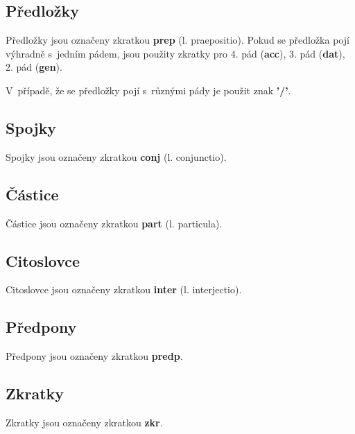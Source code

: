 \blspace
  \dicEntry {} 
  \dicEntry {}  
  \dicEntry {}  
\blspace

\subsection*{Předložky}

Předložky jsou označeny zkratkou \textbf{prep} (l. praepositio). Pokud se předložka pojí výhradně s~jedním pádem, jsou použity zkratky pro 4. pád (\textbf{acc}), 3. pád (\textbf{dat}), 2. pád (\textbf{gen}).

\blspace
  \dicEntry {}  
\blspace

V~případě, že se předložky pojí s~různými pády je použit znak \textbf{'/'}.

\blspace
  \dicEntry {}  
\blspace

\subsection*{Spojky}

Spojky jsou označeny zkratkou \textbf{conj} (l. conjunctio).

\subsection*{Částice}

Částice jsou označeny zkratkou \textbf{part} (l. particula).

\subsection*{Citoslovce}

Citoslovce jsou označeny zkratkou \textbf{inter} (l. interjectio).

\subsection*{Předpony}

Předpony jsou označeny zkratkou \textbf{predp}.

\subsection*{Zkratky}

Zkratky jsou označeny zkratkou \textbf{zkr}.

